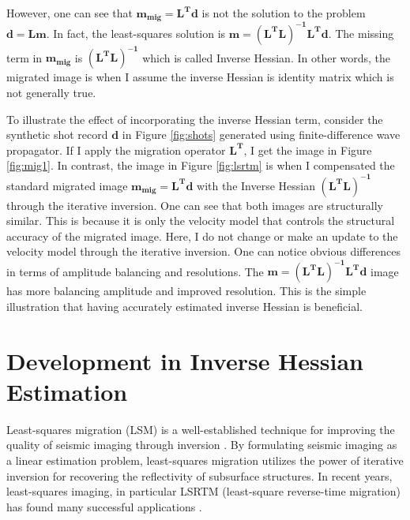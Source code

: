 However, one can see that $\mathbf{m_{mig} = L^{T}d}$ is not the solution to the problem $\mathbf{d=Lm}$. In fact, the least-squares solution is $\mathbf{m = (L^{T}L)^{-1} L^{T} d}$. The missing term in $\mathbf{m_{mig}}$ is $\mathbf{(L^{T}L)^{-1}}$ which is called Inverse Hessian. In other words, the migrated image is when I assume the inverse Hessian is identity matrix which is not generally true.





To illustrate the effect of incorporating the inverse Hessian term, consider the synthetic shot record $\mathbf{d}$ in Figure \ref{fig:shots} generated using finite-difference wave propagator. If I apply the migration operator $\mathbf{L^T}$, I get the image in Figure \ref{fig:mig1}. In contrast, the image in Figure \ref{fig:lsrtm} is when I compensated the standard migrated image $\mathbf{m_{mig} = L^{T}d }$ with the Inverse Hessian $\mathbf{(L^{T}L)^{-1}}$ through the iterative inversion. One can see that both images are structurally similar. This is because it is only the velocity model that controls the structural accuracy of the migrated image. Here, I do not change or make an update to the velocity model through the iterative inversion. One can notice obvious differences in terms of amplitude balancing and resolutions. The $\mathbf{m = (L^{T}L)^{-1} L^{T} d}$ image has more balancing amplitude and improved resolution. This is the simple illustration that having accurately estimated inverse Hessian is beneficial.


\section{Development in Inverse Hessian Estimation}

Least-squares migration (LSM) is a well-established technique for improving the quality of seismic imaging through inversion \cite[]{nemeth,ronen}. By formulating seismic imaging as a linear estimation problem, least-squares migration utilizes the power of iterative inversion for recovering the reflectivity of subsurface structures. In recent years, least-squares imaging, in particular LSRTM (least-square reverse-time migration) has found many successful applications \cite[]{dai,wang,wong}.

